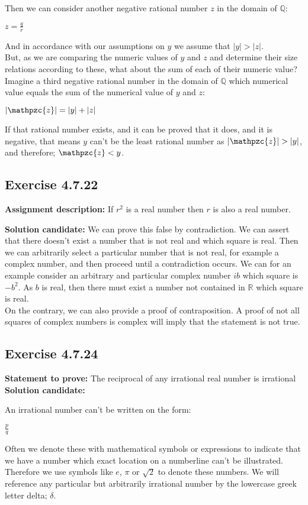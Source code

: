 \documentclass{report}
\newcommand{\cent}[1]{\begin{center}#1\end{center}}
\newcommand{\doubleR}{\mathbb{R}}
\newcommand{\doubleQ}{\mathbb{Q}}
\newcommand{\script}[1]{\mathpzc{#1}}
\newcommand{\Prove}{\textbf{Statement to prove: }}
\newcommand{\AssignmentDescription}{\textbf{Assignment description: }}
\newcommand{\Solution}{\textbf{Solution candidate: }}
\newcommand{\QED}{\boxed{}}
\newcommand{\Exercise}[1]{\subsection{Exercise #1}}
\begin{document}
	Then we can consider another negative rational number $z$ in the domain of $\doubleQ$:
	
	\cent{$z = \frac{q}{r}$}
	
	And in accordance with our assumptions on $y$ we assume that $|y| > |z|$.\\
	
	But, as we are comparing the numeric values of $y$ and $z$ and determine their size relations according to these, what about the sum of each of their numeric value?\\
	
	Imagine a third negative rational number in the domain of $\doubleQ$ which numerical value equals the sum of the numerical value of $y$ and $z$:
	
	\cent{$|\script{z}| = |y| + |z|$}
	
	If that rational number exists, and it can be proved that it does, and it is negative, that means $y$ can't be the least rational number as $|\script{z}| > |y|$, and therefore; $\script{z} < y$.\\
	\QED
	
	\Exercise{4.7.22}
	
	\AssignmentDescription
	If $r^2$ is a real number then $r$ is also a real number.
	
	\Solution
	We can prove this false by contradiction. We can assert that there doesn't exist a number that is not real and which square is real. Then we can arbitrarily select a particular number that is not real, for example a complex number, and then proceed until a contradiction occurs. We can for an example consider an arbitrary and particular complex number $ib$ which square is $-b^2$. As $b$ is real, then there must exist a number not contained in $\doubleR$ which square is real.\\
	
	On the contrary, we can also provide a proof of contraposition. A proof of not all squares of complex numbers is complex will imply that the statement is not true.\\
	
	\Exercise{4.7.24}
	
	\Prove
	The reciprocal of any irrational real number is irrational\\
	
	\Solution
	
	An irrational number can't be written on the form:
	
	\cent{$\frac{p}{q}$}
	
	Often we denote these with mathematical symbols or expressions to indicate that we have a number which exact location on a numberline can't be illustrated. Therefore we use symbols like $e$, $\pi$ or $\sqrt{2}$ to denote these numbers. We will reference any particular but arbitrarily irrational number by the lowercase greek letter delta; $\delta$.\\
	
\end{document}
